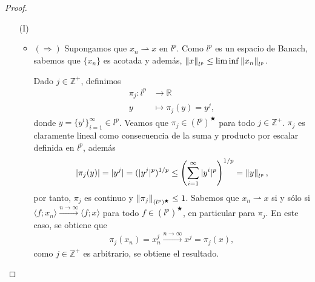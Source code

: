 \begin{proof}
    \begin{enumerate}
        \item[(I)] \begin{itemize}
            \item $(\Longrightarrow)$ Supongamos que $x_n\rightharpoonup x$ en $l^p$. Como $l^p$ es un espacio de Banach, sabemos que $\{x_n\}$ es acotada y además, $\left\|x\right\|_{l^p}\leq \liminf\left\|x_n\right\|_{l^p}$.

            Dado $j \in \mathbb{Z}^+$, definimos
            \begin{align*}
                \pi_j:l^p &\longrightarrow \mathbb{R}\\
                y &\longmapsto \pi_j(y)=y^j,
            \end{align*}
            donde $y=\{y^i\}_{i=1}^\infty\in l^p$. Veamos que $\pi_j\in (l^p)^{\bigstar}$ para todo $j \in \mathbb{Z}^+$. $\pi_j$ es claramente lineal como consecuencia de la suma y producto por escalar definida en $l^p$, además
            \begin{align*}
                |\pi_j(y)|=|y^j|=(|y^j|^p)^{1/p}\leq \left(\sum_{i=1}^\infty |y^{i}|^p\right)^{1/p}=\left\|y\right\|_{l^p},
            \end{align*}
            por tanto, $\pi_j$ es continuo y $\left\|\pi_j\right\|_{(l^p)^\bigstar}\leq 1$. Sabemos que $x_n\rightharpoonup x$ si y sólo si $\langle f;x_n\rangle\xrightarrow{n\to \infty} \langle f;x\rangle$ para todo $f\in (l^p)^\bigstar$, en particular para $\pi_j$. En este caso, se obtiene que 
            \begin{align*}
                \pi_j(x_n)=x_n^j\xrightarrow{n\to \infty}x^j=\pi_j(x),
            \end{align*}
            como $j\in \mathbb{Z}^+$ es arbitrario, se obtiene el resultado.


\end{itemize}
\end{enumerate}
\end{proof}
